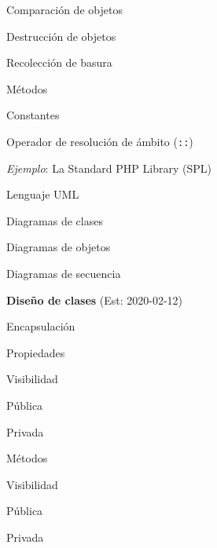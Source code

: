 \begin{longenum}
\begin{longenum}
\begin{longenum}
            \item Comparación de objetos
            \item Destrucción de objetos
            \begin{longenum}
                \item Recolección de basura
            \end{longenum}
            \item Métodos
            \item Constantes
            \begin{longenum}
                \item Operador de resolución de ámbito (\texttt{::})
            \end{longenum}
            \item \textit{Ejemplo}: La Standard PHP Library (SPL)
        \end{longenum}
        \item Lenguaje UML
        \begin{longenum}
            \item Diagramas de clases
            \item Diagramas de objetos
            \item Diagramas de secuencia
        \end{longenum}
    \end{longenum}
    \item \textbf{Diseño de clases}  (Est: 2020-02-12)
    \begin{longenum}
        \item Encapsulación
        \item Propiedades
        \begin{longenum}
            \item Visibilidad
            \begin{longenum}
                \item Pública
                \item Privada
            \end{longenum}
        \end{longenum}
        \item Métodos
        \begin{longenum}
            \item Visibilidad
            \begin{longenum}
                \item Pública
                \item Privada
            \end{longenum}

\end{longenum}
\end{longenum}
\end{longenum}
